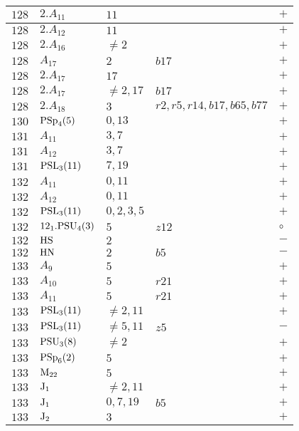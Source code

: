 \documentclass[a4paper, 11pt]{article}
\begin{document}
\begin{longtable}{lllll}
		$128$ & $2.A_{11}$ & $11$ &  & $+$ \\ \hline
		$128$ & $2.A_{12}$ & $11$ &  & $+$ \\ \hline
		$128$ & $2.A_{16}$ & $\neq 2$ &  & $+$ \\ \hline
		$128$ & $A_{17}$ & $2$ & $b17$ & $+$ \\ \hline
		$128$ & $2.A_{17}$ & $17$ &  & $+$ \\ \hline
		$128$ & $2.A_{17}$ & $\neq 2,17$ & $b17$ & $+$ \\ \hline
		$128$ & $2.A_{18}$ & $3$ & $r2, r5, r14, b17, b65, b77$ & $+$ \\ \hline
		$130$ & ${\rm PSp}_{4}(5)$ & $0,13$ &  & $+$ \\ \hline
		$131$ & $A_{11}$ & $3,7$ &  & $+$ \\ \hline
		$131$ & $A_{12}$ & $3,7$ &  & $+$ \\ \hline
		$131$ & ${\rm PSL}_{3}(11)$ & $7,19$ &  & $+$ \\ \hline
		$132$ & $A_{11}$ & $0,11$ &  & $+$ \\ \hline
		$132$ & $A_{12}$ & $0,11$ &  & $+$ \\ \hline
		$132$ & ${\rm PSL}_{3}(11)$ & $0,2,3,5$ &  & $+$ \\ \hline
		$132$ & $12_1.{\rm PSU}_{4}(3)$ & $5$ & $z12$ & $\circ$ \\ \hline
		$132$ & ${\rm HS}$ & $2$ &  & $-$ \\ \hline
		$132$ & ${\rm HN}$ & $2$ & $b5$ & $-$ \\ \hline
		$133$ & $A_{9}$ & $5$ &  & $+$ \\ \hline
		$133$ & $A_{10}$ & $5$ & $r21$ & $+$ \\ \hline
		$133$ & $A_{11}$ & $5$ & $r21$ & $+$ \\ \hline
		$133$ & ${\rm PSL}_{3}(11)$ & $\neq 2,11$ &  & $+$ \\ \hline
		$133$ & ${\rm PSL}_{3}(11)$ & $\neq 5,11$ & $z5$ & $-$ \\ \hline
		$133$ & ${\rm PSU}_{3}(8)$ & $\neq 2$ &  & $+$ \\ \hline
		$133$ & ${\rm PSp}_{6}(2)$ & $5$ &  & $+$ \\ \hline
		$133$ & ${\rm M}_{22}$ & $5$ &  & $+$ \\ \hline
		$133$ & ${\rm J}_1$ & $\neq 2,11$ &  & $+$ \\ \hline
		$133$ & ${\rm J}_1$ & $0,7,19$ & $b5$ & $+$ \\ \hline
		$133$ & ${\rm J}_2$ & $3$ &  & $+$ \\ \hline

\end{longtable}
\end{document}

